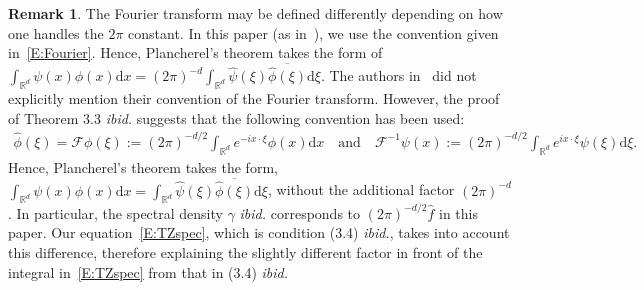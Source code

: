 \documentclass[a4paper,11pt]{article}%
\theoremstyle{plain}
\theoremstyle{definition}
\newtheorem{remark}[theorem]{Remark}
\numberwithin{equation}{section}
\newcommand{\R}{\mathbb{R}}
\newcommand{\ud}{\ensuremath{\mathrm{d}}}
\begin{document}
\begin{remark}\label{R:Fourier}
  The Fourier transform may be defined differently depending on how one handles the $2\pi$ constant.
  In this paper (as in~\cite{chen.kim:19:nonlinear,chen.huang:19:comparison}), we use the convention
  given in~\eqref{E:Fourier}. Hence, Plancherel's theorem takes the form of $\int_{\R^d} \psi(x)
  \phi(x)\ud x = (2\pi)^{-d} \int_{\R^d} \widehat{\psi}(\xi) \overline{\widehat{\phi}(\xi)}\ud \xi$.
  The authors in~\cite{tessitore.zabczyk:98:invariant} did not explicitly mention their convention
  of the Fourier transform. However, the proof of Theorem 3.3 \textit{ibid.} suggests that the
  following convention has been used:
	\begin{align*}
	\widehat{\phi}(\xi)      = \mathcal{F}\phi(\xi) := (2\pi)^{-d/2} \int_{\R^d} e^{-i x\cdot\xi} \phi(x)\ud x \quad \text{and} \quad
	\mathcal{F}^{-1}\psi(x) := (2\pi)^{-d/2} \int_{\R^d} e^{i x\cdot\xi} \psi(\xi)\ud \xi.
	\end{align*}
  Hence, Plancherel's theorem takes the form, $\int_{\R^d} \psi(x) \phi(x)\ud x = \int_{\R^d}
  \widehat{\psi}(\xi) \overline{\widehat{\phi}(\xi)}\ud \xi$, without the additional factor
  $(2\pi)^{-d}$. In particular, the spectral density $\gamma$ \textit{ibid.} corresponds to
  $\left(2\pi\right)^{-d/2}\widehat{f}$ in this paper. Our equation~\eqref{E:TZspec}, which is
  condition (3.4) \textit{ibid.}, takes into account this difference, therefore explaining the
  slightly different factor in front of the integral in~\eqref{E:TZspec} from that in (3.4)
  \textit{ibid.}
\end{remark}

\end{document}
